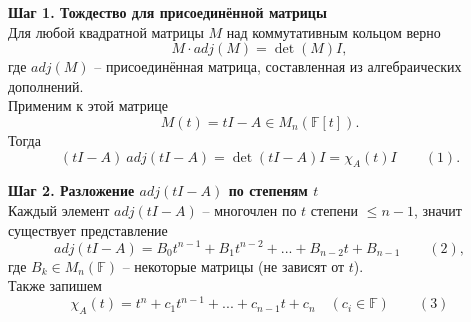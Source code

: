 \documentclass[14pt]{extreport}
\begin{document}
    \begin{prbox}
        \textbf{Шаг 1. Тождество для присоединённой матрицы}\\
        Для любой квадратной матрицы $M$ над коммутативным кольцом верно
        \[
        M \cdot adj(M) = \det(M)I,
        \]
        где $adj(M)$ – присоединённая матрица, составленная из алгебраических дополнений.\\
        Применим к этой матрице
        \[
        M(t) = tI - A \in M_n(\mathbb{F}[t]).
        \]
        Тогда
        \[
        (tI-A)\ adj(tI-A) = \det(tI-A)I = \chi_A(t)I \qquad (1).
        \]

        \textbf{Шаг 2. Разложение $adj(tI-A)$ по степеням $t$}\\
        Каждый элемент $adj(tI-A)$ – многочлен по $t$ степени $\leq n-1$, значит существует представление
        \[
        adj(tI-A) = B_0t^{n-1} + B_1t^{n-2} + ... + B_{n-2}t + B_{n-1} \qquad (2),
        \]
        где $B_k \in M_n(\mathbb{F})$ – некоторые матрицы (не зависят от $t$).\\
        Также запишем
        \[
        \chi_A(t) = t^n + c_1t^{n-1} + ... + c_{n-1}t + c_n \quad (c_i \in \mathbb{F}) \qquad (3)
        \]


\end{prbox}
\end{document}
